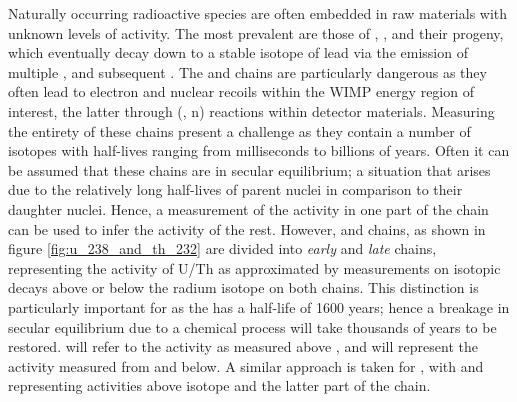 Naturally occurring radioactive species are often embedded in raw materials with unknown levels of activity. The most prevalent are those of \UTTE{}, \UTTF{}, \ThTTT{} and their progeny, which eventually decay down to a stable isotope of lead via the emission of multiple \alpha{}, \beta{} and subsequent \grays{}. The \UTTE{} and \ThTTT{} chains are particularly dangerous as they often lead to electron and nuclear recoils within the WIMP energy region of interest, the latter through (\alpha, n) reactions within detector materials. 
Measuring the entirety of these chains present a challenge as they contain a number of isotopes with half-lives ranging from milliseconds to billions of years. Often it can be assumed that these chains are in secular equilibrium; a situation that arises due to the relatively long half-lives of parent nuclei in comparison to their daughter nuclei. Hence, a measurement of the activity in one part of the chain can be used to infer the activity of the rest. 
However, \UTTE{} and \ThTTT{} chains, as shown in figure \ref{fig:u_238_and_th_232} are divided into \textit{early} and \textit{late} chains, representing the activity of U/Th as approximated by measurements on isotopic decays above or below the radium isotope on both chains. This distinction is particularly important for \UTTE{} as the \RaTTS{} has a half-life of 1600 years; hence a breakage in secular equilibrium due to a chemical process will take thousands of years to be restored. \UTTEe{} will refer to the \UTTE{} activity as measured above \RaTTS{}, and \UTTEl{} will represent the activity measured from \RaTTS{} and below. A similar approach is taken for \ThTTT{}, with \ThTTTe{} and \ThTTTl{} representing activities above \RaTTE{} isotope and the latter part of the chain.
%
